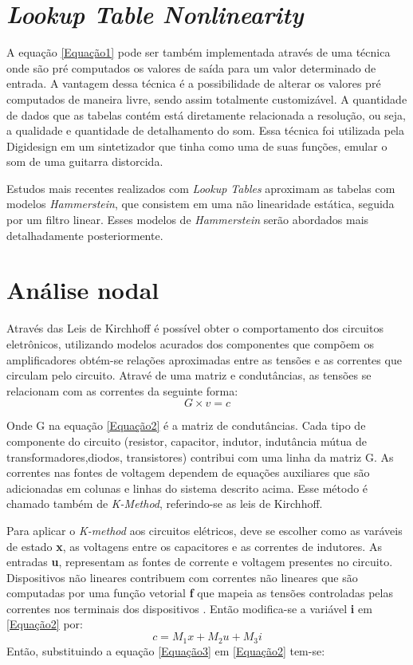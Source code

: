 \section*{\textit{Lookup Table Nonlinearity}}

A equação \ref{Equação1} pode ser também implementada através de uma técnica onde são pré computados os valores de saída para um valor determinado de entrada. A vantagem dessa técnica é a possibilidade de alterar os valores pré computados de maneira livre, sendo assim totalmente customizável\cite{pakarinen2009review}. A quantidade de dados que as tabelas contém está diretamente relacionada a resolução, ou seja, a qualidade e quantidade de detalhamento do som. Essa técnica foi utilizada pela Digidesign em um sintetizador que tinha como uma de suas funções, emular o som de uma guitarra distorcida. 

Estudos mais recentes realizados com \textit{Lookup Tables}
aproximam as tabelas com modelos \textit{Hammerstein}, que consistem em uma não linearidade estática, seguida por um filtro linear\cite{LUTFilter}. Esses modelos de \textit{Hammerstein} serão abordados mais detalhadamente posteriormente.

\section*{Análise nodal}
Através das Leis de Kirchhoff é possível obter o comportamento dos circuitos eletrônicos, utilizando modelos acurados dos componentes que compõem os amplificadores obtém-se relações aproximadas entre as tensões e as correntes que circulam pelo circuito. Atravé de uma matriz e condutâncias, as tensões se relacionam com as correntes da seguinte forma:\cite{pakarinen2009review}
\begin{equation}
G\times v = c 
\label{Equação2}
\end{equation}

Onde G na equação \ref{Equação2} é a matriz de condutâncias. Cada tipo de componente do circuito (resistor, capacitor, indutor, indutância mútua de transformadores,diodos, transistores) contribui com uma linha da matriz G. As correntes nas fontes de voltagem dependem de equações auxiliares que são adicionadas em colunas e linhas do sistema descrito acima. Esse método é chamado também de \textit{K-Method}, referindo-se as leis de Kirchhoff.


Para aplicar o \textit{K-method} aos circuitos elétricos, deve se escolher como as varáveis de estado \textbf{x}, as voltagens entre os capacitores e as correntes de indutores. As entradas \textbf{u}, representam as fontes de corrente e voltagem presentes no circuito. Dispositivos não lineares contribuem com correntes não lineares que são computadas por uma função vetorial \textbf{f} que mapeia as tensões controladas pelas correntes nos terminais dos dispositivos \cite{yeh2010automated1}. Então modifica-se a variável \textbf{i} em \ref{Equação2} por:
\begin{equation}
c =M_{1}x + M_{2}u + M_{3}i
\label{Equação3}
\end{equation}
Então, substituindo a equação \ref{Equação3} em \ref{Equação2} tem-se:

